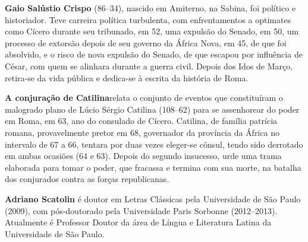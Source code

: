 \textbf{Gaio Salústio Crispo} (86--34), nascido em Amiterno, na Sabina, foi político e historiador. Teve carreira política turbulenta, com enfrentamentos a optimates como Cícero durante seu tribunado, em 52, uma expulsão do Senado, em 50, um processo de extorsão depois de seu governo da África Nova, em 45, de que foi absolvido, e o risco de nova expulsão do Senado, de que escapou por influência de César, com quem se alinhara durante a guerra civil. Depois dos Idos de Março, retira-se da vida pública e dedica-se à escrita da história de Roma.


\textbf{A conjuração de Catilina}relata o conjunto de eventos que constituíram o malogrado plano de Lúcio
Sérgio Catilina (108--62) para se assenhorear do poder em Roma, em 63,
ano do consulado de Cícero. Catilina, de família patrícia romana,
provavelmente pretor em 68, governador da província da África no intervalo
de 67 a 66, tentara por duas vezes eleger-se cônsul, tendo sido derrotado
em ambas ocasiões (64 e 63). Depois do segundo insucesso, urde uma trama elaborada
para tomar o poder, que fracassa e termina com sua morte, na batalha dos conjurados contra as forças republicanas.


\textbf{Adriano Scatolin} é doutor em Letras Clássicas pela
Universidade de São Paulo (2009), com pós-doutorado pela Universidade Paris
 Sorbonne (2012--2013). Atualmente é Professor Doutor da área de Língua e Literatura Latina da Universidade de
São Paulo.

